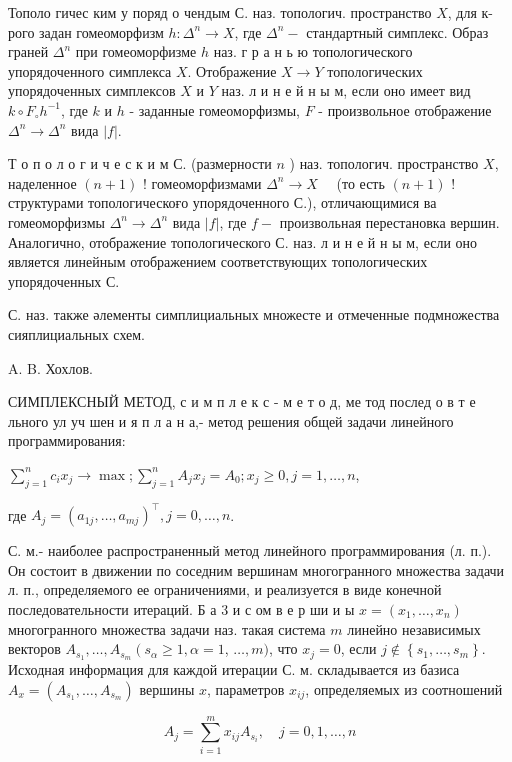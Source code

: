 \documentclass[10pt]{article}
\begin{document}
Тополо гичес ким у поряд о чендым С. наз. топологич. пространство $X$, для к-рого задан гомеоморфизм $h: \Delta^{n} \rightarrow X$, где $\Delta^{n}-$ стандартный симплекс. Образ граней $\Delta^{n}$ при гомеоморфизме $h$ наз. г р а н ь ю топологического упорядоченного симплекса $X$. Отображение $X \rightarrow Y$ топологических упорядоченных симплексов $X$ и $Y$ наз. л и н е й н ы м, если оно имеет вид $k \circ F_{\circ} h^{-1}$, где $k$ и $h$ - заданные гомеоморфизмы, $F$ - произвольное отображение $\Delta^{n} \rightarrow \Delta^{n}$ вида $|f|$.



Т о п о л о г и ч е с к и м С. (размерности $n$ ) наз. топологич. пространство $X$, наделенное $(n+1)$ ! гомеоморфизмами $\Delta^{n} \rightarrow X \quad$ (то есть $(n+1)$ ! структурами топологическоғо упорядоченного С.), отличающимися ва гомеоморфизмы $\Delta^{n} \rightarrow \Delta^{n}$ вида $|f|$, где $f-$ произвольная перестановка вершин. Аналогично, отображение топологического С. наз. л и н е й н ы м, если оно является линейным отображением соответствующих топологических упорядоченных С.



С. наз. также әлементы симплициальных множесте и отмеченные подмножества сияплициальных схем.



A. B. Хохлов.



СИМПЛЕКСНЫЙ МЕТОД, с и м п л е к с - м е т о д, ме тод послед о в т е льного ул уч шен и я п л а н а,- метод решения общей задачи линейного программирования:



$\sum_{j=1}^{n} c_{i} x_{j} \longrightarrow \max ; \sum_{j=1}^{n} A_{j} x_{j}=A_{0} ; x_{j} \geqslant 0, j=1, \ldots, n$,



где $A_{j}=\left(a_{1 j}, \ldots, a_{m j}\right)^{\top}, j=0, \ldots, n$.



С. м.- наиболее распространенный метод линейного программирования (л. п.). Он состоит в движении по соседним вершинам многогранного множества задачи л. п., определяемого ее ограничениями, и реализуется в виде конечной последовательности итераций. Б а 3 и с ом в е р ши и ы $x=\left(x_{1}, \ldots, x_{n}\right)$ многогранного множества задачи наз. такая система $m$ линейно независимых векторов $A_{s_{1}}, \ldots, A_{s_{m}}\left(s_{\alpha} \geqslant 1, \alpha=1\right.$, $\ldots, m)$, что $x_{j}=0$, если $j \notin\left\{s_{1}, \ldots, s_{m}\right\}$. Исходная информация для каждой итерации С. м. складывается из базиса $A_{x}=\left(A_{s_{1}}, \ldots, A_{s_{m}}\right)$ вершины $x$, параметров $x_{i j}$, определяемых из соотношений



\[

A_{j}=\sum_{i=1}^{m} x_{i j} A_{s_{i}}, \quad j=0,1, \ldots, n

\]
\end{document}

